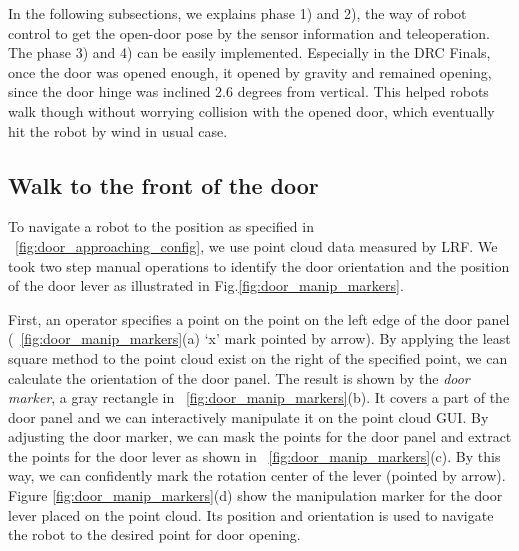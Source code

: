 

In the following subsections, we explains phase 1) and 2), the way of robot control to get the open-door pose
by the sensor information and teleoperation. The phase 3) and 4) can be easily implemented. 
Especially in the DRC Finals, once the door was opened enough, it opened by gravity
and remained opening, since the door hinge was inclined 2.6 degrees from vertical.
This helped robots walk though without worrying collision with the opened door, which eventually hit the
robot by wind in usual case. 

\subsection{Walk to the front of the door}
%
To navigate a robot to the position as specified in \figurename~\ref{fig:door_approaching_config}, we use
point cloud data measured by LRF. 
We took two step manual operations to identify the door orientation and the position of the door lever 
as illustrated in Fig.\ref{fig:door_manip_markers}.

First, an operator specifies a point on the point on the left edge of the door panel (\figurename~\ref{fig:door_manip_markers}(a) `x' mark pointed by arrow). By applying the least square method to the point cloud exist on the right of the specified point, we can calculate the orientation of the door panel.
The result is shown by the {\it door marker}, a gray rectangle in \figurename~\ref{fig:door_manip_markers}(b).
It covers a part of the door panel and we can interactively manipulate it on the 
point cloud GUI. By adjusting the door marker, we can mask the points for the door panel and extract the points for the door lever as shown in \figurename~\ref{fig:door_manip_markers}(c).
By this way, we can confidently mark the rotation center of the lever (pointed by arrow).
Figure \ref{fig:door_manip_markers}(d) show the manipulation marker for the door lever placed on the point cloud. Its position and orientation is used to navigate the robot to the desired point for door opening.

